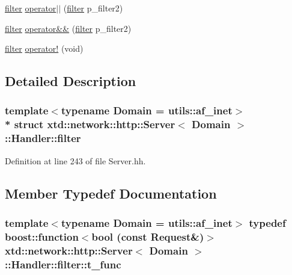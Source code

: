 \begin{DoxyCompactItemize}
\item 
\hyperlink{structxtd_1_1network_1_1http_1_1Server_1_1Handler_1_1filter}{filter} \hyperlink{structxtd_1_1network_1_1http_1_1Server_1_1Handler_1_1filter_a552b18f4f6e535a016d547ce0efc53c8}{operator$\vert$$\vert$} (\hyperlink{structxtd_1_1network_1_1http_1_1Server_1_1Handler_1_1filter}{filter} p\+\_\+filter2)
\item 
\hyperlink{structxtd_1_1network_1_1http_1_1Server_1_1Handler_1_1filter}{filter} \hyperlink{structxtd_1_1network_1_1http_1_1Server_1_1Handler_1_1filter_a5da9bfbb2192792c99106f3969084395}{operator\&\&} (\hyperlink{structxtd_1_1network_1_1http_1_1Server_1_1Handler_1_1filter}{filter} p\+\_\+filter2)
\item 
\hyperlink{structxtd_1_1network_1_1http_1_1Server_1_1Handler_1_1filter}{filter} \hyperlink{structxtd_1_1network_1_1http_1_1Server_1_1Handler_1_1filter_a86cabcb78e717225417801afb5ca0969}{operator!} (void)
\end{DoxyCompactItemize}


\subsection{Detailed Description}
\subsubsection*{template$<$typename Domain = utils\+::af\+\_\+inet$>$\\*
struct xtd\+::network\+::http\+::\+Server$<$ Domain $>$\+::\+Handler\+::filter}



Definition at line 243 of file Server.\+hh.



\subsection{Member Typedef Documentation}
\subsubsection[{\texorpdfstring{t\+\_\+func}{t_func}}]{\setlength{\rightskip}{0pt plus 5cm}template$<$typename Domain  = utils\+::af\+\_\+inet$>$ typedef boost\+::function$<$bool (const {\bf Request}\&)$>$ {\bf xtd\+::network\+::http\+::\+Server}$<$ Domain $>$\+::{\bf Handler\+::filter\+::t\+\_\+func}}\hypertarget{structxtd_1_1network_1_1http_1_1Server_1_1Handler_1_1filter_a7a443c95291e03dff64632da70c3970e}{}\label{structxtd_1_1network_1_1http_1_1Server_1_1Handler_1_1filter_a7a443c95291e03dff64632da70c3970e}


